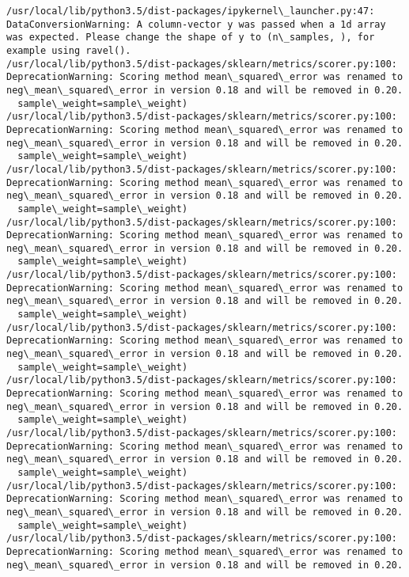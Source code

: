 \documentclass[11pt]{article}
\begin{document}
    \begin{Verbatim}[commandchars=\\\{\}]
/usr/local/lib/python3.5/dist-packages/ipykernel\_launcher.py:47: DataConversionWarning: A column-vector y was passed when a 1d array was expected. Please change the shape of y to (n\_samples, ), for example using ravel().
/usr/local/lib/python3.5/dist-packages/sklearn/metrics/scorer.py:100: DeprecationWarning: Scoring method mean\_squared\_error was renamed to neg\_mean\_squared\_error in version 0.18 and will be removed in 0.20.
  sample\_weight=sample\_weight)
/usr/local/lib/python3.5/dist-packages/sklearn/metrics/scorer.py:100: DeprecationWarning: Scoring method mean\_squared\_error was renamed to neg\_mean\_squared\_error in version 0.18 and will be removed in 0.20.
  sample\_weight=sample\_weight)
/usr/local/lib/python3.5/dist-packages/sklearn/metrics/scorer.py:100: DeprecationWarning: Scoring method mean\_squared\_error was renamed to neg\_mean\_squared\_error in version 0.18 and will be removed in 0.20.
  sample\_weight=sample\_weight)
/usr/local/lib/python3.5/dist-packages/sklearn/metrics/scorer.py:100: DeprecationWarning: Scoring method mean\_squared\_error was renamed to neg\_mean\_squared\_error in version 0.18 and will be removed in 0.20.
  sample\_weight=sample\_weight)
/usr/local/lib/python3.5/dist-packages/sklearn/metrics/scorer.py:100: DeprecationWarning: Scoring method mean\_squared\_error was renamed to neg\_mean\_squared\_error in version 0.18 and will be removed in 0.20.
  sample\_weight=sample\_weight)
/usr/local/lib/python3.5/dist-packages/sklearn/metrics/scorer.py:100: DeprecationWarning: Scoring method mean\_squared\_error was renamed to neg\_mean\_squared\_error in version 0.18 and will be removed in 0.20.
  sample\_weight=sample\_weight)
/usr/local/lib/python3.5/dist-packages/sklearn/metrics/scorer.py:100: DeprecationWarning: Scoring method mean\_squared\_error was renamed to neg\_mean\_squared\_error in version 0.18 and will be removed in 0.20.
  sample\_weight=sample\_weight)
/usr/local/lib/python3.5/dist-packages/sklearn/metrics/scorer.py:100: DeprecationWarning: Scoring method mean\_squared\_error was renamed to neg\_mean\_squared\_error in version 0.18 and will be removed in 0.20.
  sample\_weight=sample\_weight)
/usr/local/lib/python3.5/dist-packages/sklearn/metrics/scorer.py:100: DeprecationWarning: Scoring method mean\_squared\_error was renamed to neg\_mean\_squared\_error in version 0.18 and will be removed in 0.20.
  sample\_weight=sample\_weight)
/usr/local/lib/python3.5/dist-packages/sklearn/metrics/scorer.py:100: DeprecationWarning: Scoring method mean\_squared\_error was renamed to neg\_mean\_squared\_error in version 0.18 and will be removed in 0.20.

\end{Verbatim}
\end{document}
